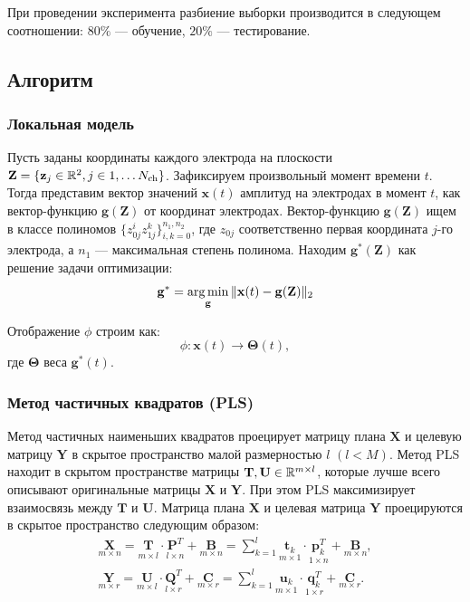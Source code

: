 \documentclass[12pt, twoside]{article}
\begin{document}
При проведении эксперимента разбиение выборки производится в следующем соотношении: $80\%$ --- обучение, $20\%$ --- тестирование.

\subsection{Алгоритм}
\subsubsection{Локальная модель}
Пусть заданы координаты каждого электрода на плоскости $\mathbf{Z} = \{\mathbf{z}_j \in \mathbb{R}^2, j \in {1, \ldots N_\text{ch}} \}$. Зафиксируем произвольный момент времени $t$. Тогда представим вектор значений $\mathbf{x}(t)$ амплитуд на электродах в момент $t$, как вектор-функцию $\mathbf{g}(\mathbf{Z})$ от координат электродах. Вектор-функцию $\mathbf{g}(\mathbf{Z})$ ищем в классе полиномов $\{z_{0j}^iz_{1j}^k\}_{i,k = 0}^{n_1, n_2}$, где $z_{0j}$ соответственно первая координата $j$-го электрода, а $n_1$ --- максимальная степень полинома. Находим $\mathbf{g^*}(\mathbf{Z})$ как решение задачи оптимизации:
\[
\mathbf{g^*} = \argmin_{\mathbf{g}} \|\mathbf{x}(t) - \mathbf{g}(\mathbf{Z})\|_2
\]

Отображение $\phi$ строим как: 
\[
	\phi: \mathbf{x}(t) \rightarrow \pmb{\Theta}(t), 
\] где $\pmb{\Theta}$ веса $\mathbf{g^*}(t).$
\subsubsection{Метод частичных квадратов (PLS)}

Метод частичных наименьших квадратов проецирует матрицу плана $\mathbf{X}$ и целевую
 матрицу $\mathbf{Y}$ в скрытое пространство малой размерностью $l$ $(l < M)$. Метод PLS находит в скрытом пространстве матрицы $\mathbf{T}, \mathbf{U} \in \RR
^{m\times l}$, которые лучше всего описывают оригинальные матрицы $\mathbf{X}$ и $\mathbf{Y}$. При этом PLS максимизирует взаимосвязь между $\mathbf{T}$ и $\mathbf{U}$.
Матрица плана $\mathbf{X}$ и целевая матрица $\mathbf{Y}$ проецируются в скрытое пространство следующим образом:
\begin{equation*}
\begin{split}
\underset{m\times n
}{\mathbf{X}}= \underset{m\times l}{\mathbf{T}} \cdot \underset{l\times n
}{\mathbf{P}^T}
+ \underset{m\times n}{\mathbf{B}}
=
\sum_{k=1}^{l}
\underset{m\times 1}{\mathbf{t}_k}
\cdot\underset{1\times n}{\mathbf{p}^T_k}
+ \underset{m\times n}{\mathbf{B}}
, 
\\ 
\underset{m\times r}{\mathbf{Y}}
= \underset{m\times l}{\mathbf{U}} \cdot \underset{l\times r
}{\mathbf{Q}^T}
+ \underset{m\times r
}{\mathbf{C}}= \sum_{k=1}^l
\underset{m\times 1}{\mathbf{u}_k} \cdot \underset{1\times r}{\mathbf{q}^T_k}
+ \underset{m\times r}{\mathbf{C}}.
\end{split}
\end{equation*}
\end{document}
